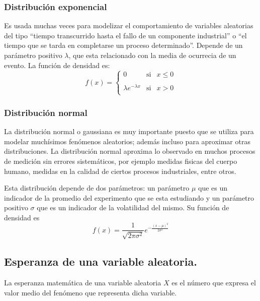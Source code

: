 \documentclass[
  12pt,
]{krantz}
\theoremstyle{definition}
\theoremstyle{definition}
\theoremstyle{definition}
\theoremstyle{remark}
\begin{document}
\hypertarget{distribucion-exponencial}{%
\subsubsection{Distribución exponencial}\label{distribucion-exponencial}}

Es usada muchas veces para modelizar el comportamiento de variables aleatorias del tipo ``tiempo transcurrido hasta el fallo de un componente industrial'' o ``el tiempo que se tarda en completarse un proceso determinado''. Depende de un parámetro positivo \(\lambda\), que esta relacionado con la media de ocurrecia de un evento. La función de densidad es:\[f(x)= \left\{ \begin{array}{lcc}
             0 &   \textrm{si}  & x \leq 0 \\
             \\ \lambda e^{-\lambda x} &  \textrm{si} & x>0 \\
             \end{array}
   \right.\]

\hypertarget{distribucion-normal}{%
\subsubsection{Distribución normal}\label{distribucion-normal}}

La distribución normal o gaussiana es muy importante puesto que se utiliza para modelar muchísimos fenómenos aleatorios; además incluso para aproximar otras distribuciones. La distribución normal aproxima lo observado en muchos procesos de medición sin errores sistemáticos, por ejemplo medidas fisicas del cuerpo humano, medidas en la calidad de ciertos procesos industriales, entre otros.

Esta distribución depende de dos parámetros: un parámetro \(\mu\) que es un indicador de la promedio del experimento que se esta estudiando y un parámetro positivo \(\sigma\) que es un indicador de la volatilidad del mismo. Su función de densidad es \[f(x)=\frac{1}{\sqrt{2\pi\sigma^2}}e^{-\frac{(x-\mu)^2}{2\sigma^2}}\]

\hypertarget{esperanza-de-una-variable-aleatoria.}{%
\subsection{Esperanza de una variable aleatoria.}\label{esperanza-de-una-variable-aleatoria.}}

La esperanza matemática de una variable aleatoria \(X\) es el número que expresa el valor medio del fenómeno que representa dicha variable.
\end{document}
